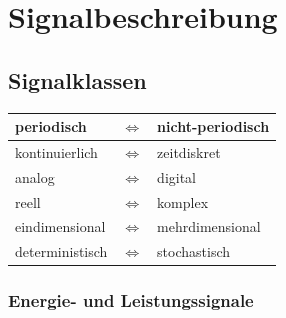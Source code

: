 \section{Signalbeschreibung }
	\renewcommand{\arraystretchOriginal}{1}
	
	\subsection{Signalklassen }
	
		\begin{tabular}{|l|c|l|}
		\hline 
		periodisch & $\Longleftrightarrow$ & nicht-periodisch \\ 
		\hline 
		kontinuierlich & $\Longleftrightarrow$ & zeitdiskret \\ 
		\hline 
		analog & $\Longleftrightarrow$ & digital \\ 
		\hline 
		reell & $\Longleftrightarrow$ & komplex \\ 
		\hline 
		eindimensional & $\Longleftrightarrow$ & mehrdimensional \\ 
		\hline 
		deterministisch & $\Longleftrightarrow$ & stochastisch \\ 
		\hline 
		\end{tabular}


		\subsubsection{Energie- und Leistungssignale }
		
